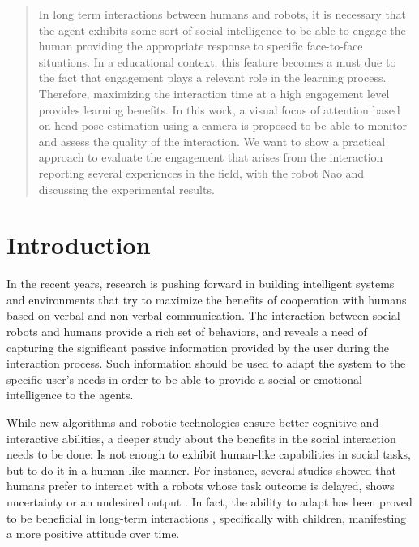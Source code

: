 \documentclass{sig-alternate}
\begin{document}
\maketitle
\begin{abstract}
In long term interactions between humans and robots, it is necessary that the agent exhibits some sort of social intelligence to be able to engage the human providing the appropriate response to specific face-to-face situations. In a educational context, this feature becomes a must due to the fact that engagement plays a relevant role in the learning process. Therefore, maximizing the interaction time at a high engagement level provides learning benefits. In this work, a visual focus of attention based on head pose estimation using a camera is proposed to be able to monitor and assess the quality of the interaction. We want to show a practical approach to evaluate the engagement that arises from the interaction reporting several experiences in the field, with the robot Nao and discussing the experimental results.
\end{abstract}




\section{Introduction}

In the recent years, research is pushing forward in building intelligent systems and environments that try to maximize the benefits of cooperation with humans based on verbal and non-verbal communication. The interaction between social robots and humans provide a rich set of behaviors, and reveals a need of capturing the significant passive information provided by the user during the interaction process. Such information should be used to adapt the system to the specific user's needs in order to be able to provide a social or emotional intelligence to the agents. 

While new algorithms and robotic technologies ensure better cognitive and interactive abilities, a deeper study about the benefits in the social interaction needs to be done: Is not enough to exhibit human-like capabilities in social tasks, but to do it in a human-like manner. For instance, several studies showed that humans prefer to interact with a robots whose task outcome is delayed, shows uncertainty or an undesired output \cite{Admoni,Short}. In fact, the ability to adapt has been proved to be beneficial in long-term interactions \cite{Tielman:2014, Lim:2014}, specifically with children, manifesting a more positive attitude over time.
\end{document}

